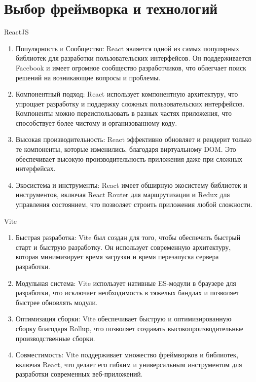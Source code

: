 \documentclass[a4paper,12pt]{article}
\begin{document}
    \section{Выбор фреймворка и технологий}\label{sec:---}
    ReactJS
    \begin{enumerate}
        \item Популярность и Сообщество: React является одной из самых популярных библиотек для разработки пользовательских интерфейсов.
        Он поддерживается Facebook и имеет огромное сообщество разработчиков, что облегчает поиск решений на возникающие вопросы и проблемы.

        \item Компонентный подход: React использует компонентную архитектуру, что упрощает разработку и поддержку сложных пользовательских интерфейсов.
        Компоненты можно переиспользовать в разных частях приложения, что способствует более чистому и организованному коду.

        \item Высокая производительность: React эффективно обновляет и рендерит только те компоненты, которые изменились, благодаря виртуальному DOM\@.
        Это обеспечивает высокую производительность приложения даже при сложных интерфейсах.

        \item Экосистема и инструменты: React имеет обширную экосистему библиотек и инструментов, включая React Router для маршрутизации и Redux для управления состоянием, что позволяет строить приложения любой сложности.

    \end{enumerate}


    Vite
    \begin{enumerate}
        \item Быстрая разработка: Vite был создан для того, чтобы обеспечить быстрый старт и быструю разработку.
        Он использует современную архитектуру, которая минимизирует время загрузки и время перезапуска сервера разработки.


        \item Модульная система: Vite использует нативные ES-модули в браузере для разработки, что исключает необходимость в тяжелых бандлах и позволяет быстрее обновлять модули.

        \item Оптимизация сборки: Vite обеспечивает быструю и оптимизированную сборку благодаря Rollup, что позволяет создавать высокопроизводительные производственные сборки.

        \item Совместимость: Vite поддерживает множество фреймворков и библиотек, включая React, что делает его гибким и универсальным инструментом для разработки современных веб-приложений.

    \end{enumerate}
\end{document}
